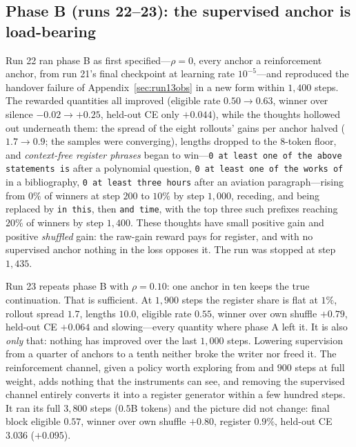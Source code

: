 \documentclass{article} %
\begin{document}
\subsection{Phase B (runs 22--23): the supervised anchor is load-bearing}
\label{sec:phaseBres}

Run 22 ran phase B as first specified---$\rho = 0$, every anchor a reinforcement anchor, from run 21's final checkpoint at learning rate $10^{-5}$---and reproduced the handover failure of Appendix~\ref{sec:run13obs} in a new form within $1{,}400$ steps. The rewarded quantities all improved (eligible rate $0.50 \to 0.63$, winner over silence $-0.02 \to +0.25$, held-out CE only $+0.044$), while the thoughts hollowed out underneath them: the spread of the eight rollouts' gains per anchor halved ($1.7 \to 0.9$; the samples were converging), lengths dropped to the $8$-token floor, and \emph{context-free register phrases} began to win---\texttt{0 at least one of the above statements is} after a polynomial question, \texttt{0 at least one of the works of} in a bibliography, \texttt{0 at least three hours} after an aviation paragraph---rising from $0\%$ of winners at step $200$ to $10\%$ by step $1{,}000$, receding, and being replaced by \texttt{in this}, then \texttt{and time}, with the top three such prefixes reaching $20\%$ of winners by step $1{,}400$. These thoughts have small positive gain and positive \emph{shuffled} gain: the raw-gain reward pays for register, and with no supervised anchor nothing in the loss opposes it. The run was stopped at step $1{,}435$.

Run 23 repeats phase B with $\rho = 0.10$: one anchor in ten keeps the true continuation. That is sufficient. At $1{,}900$ steps the register share is flat at $1\%$, rollout spread $1.7$, lengths $10.0$, eligible rate $0.55$, winner over own shuffle $+0.79$, held-out CE $+0.064$ and slowing---every quantity where phase A left it. It is also \emph{only} that: nothing has improved over the last $1{,}000$ steps. Lowering supervision from a quarter of anchors to a tenth neither broke the writer nor freed it. The reinforcement channel, given a policy worth exploring from and $900$ steps at full weight, adds nothing that the instruments can see, and removing the supervised channel entirely converts it into a register generator within a few hundred steps. It ran its full $3{,}800$ steps ($0.5$B tokens) and the picture did not change: final block eligible $0.57$, winner over own shuffle $+0.80$, register $0.9\%$, held-out CE $3.036$ ($+0.095$).
\end{document}

